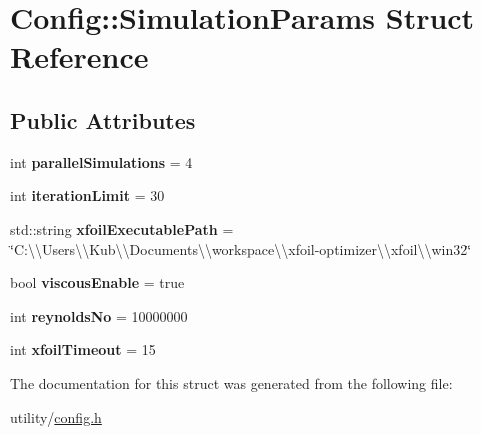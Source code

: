 \hypertarget{struct_config_1_1_simulation_params}{}\section{Config\+:\+:Simulation\+Params Struct Reference}
\label{struct_config_1_1_simulation_params}
\subsection*{Public Attributes}
\begin{DoxyCompactItemize}
\item 
\mbox{\label{struct_config_1_1_simulation_params_add5098bd19f9fa244339ea37d9a01899}} 
int {\bfseries parallel\+Simulations} = 4
\item 
\mbox{\label{struct_config_1_1_simulation_params_a617db5f91592e59d7e08362078fc68e8}} 
int {\bfseries iteration\+Limit} = 30
\item 
\mbox{\label{struct_config_1_1_simulation_params_af3d6c0f86f6c34cff3b9cedbca5eac2a}} 
std\+::string {\bfseries xfoil\+Executable\+Path} = \char`\"{}C\+:\textbackslash{}\textbackslash{}\+Users\textbackslash{}\textbackslash{}\+Kub\textbackslash{}\textbackslash{}\+Documents\textbackslash{}\textbackslash{}workspace\textbackslash{}\textbackslash{}xfoil-\/optimizer\textbackslash{}\textbackslash{}xfoil\textbackslash{}\textbackslash{}win32\char`\"{}
\item 
\mbox{\label{struct_config_1_1_simulation_params_a15e8a8fdd1882a8d346aa427ffb84053}} 
bool {\bfseries viscous\+Enable} = true
\item 
\mbox{\label{struct_config_1_1_simulation_params_a9f42dfb281e0b01210ac5643f4d81a30}} 
int {\bfseries reynolds\+No} = 10000000
\item 
\mbox{\label{struct_config_1_1_simulation_params_afec17448be290e3aadba3354150ab580}} 
int {\bfseries xfoil\+Timeout} = 15
\end{DoxyCompactItemize}


The documentation for this struct was generated from the following file\+:\begin{DoxyCompactItemize}
\item 
utility/\hyperlink{config_8h}{config.\+h}\end{DoxyCompactItemize}
